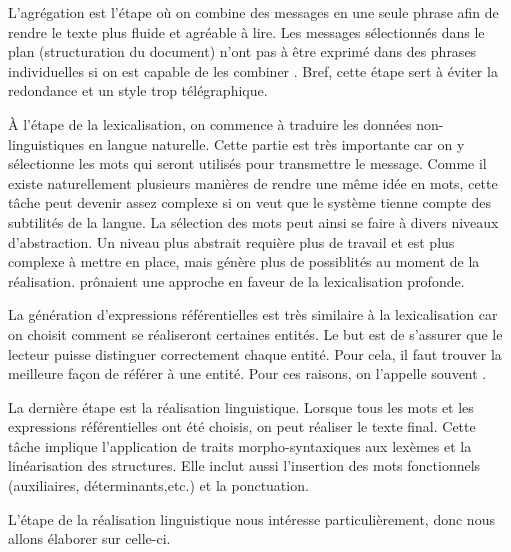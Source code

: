L'agrégation est l'étape où on combine des messages en une seule phrase afin de rendre le texte plus fluide et agréable à lire. Les messages sélectionnés dans le plan (structuration du document) n'ont pas à être exprimé dans des phrases individuelles si on est capable de les combiner \citep{ChengCapturingInteractionAggregation2000}. Bref, cette étape sert à éviter la redondance et un style trop télégraphique.

À l'étape de la lexicalisation, on commence à traduire les données non-linguistiques en langue naturelle. Cette partie est très importante car on y sélectionne les mots qui seront utilisés pour transmettre le message. Comme il existe naturellement plusieurs manières de rendre une même idée en mots, cette tâche peut devenir assez complexe si on veut que le système tienne compte des subtilités de la langue. La sélection des mots peut ainsi se faire à divers niveaux d'abstraction. Un niveau plus abstrait requière plus de travail et est plus complexe à mettre en place, mais génère plus de possiblités au moment de la réalisation. \cite{ElhadadFloatingConstraintsLexical1997} prônaient une approche en faveur de la lexicalisation profonde.

La génération d'expressions référentielles est très similaire à la lexicalisation car on choisit comment se réaliseront certaines entités. Le but est de s'assurer que le lecteur puisse distinguer correctement chaque entité. Pour cela, il faut trouver la meilleure façon de référer à une entité. Pour ces raisons, on l'appelle souvent .

\label{real}
La dernière étape est la réalisation linguistique. Lorsque tous les mots et les expressions référentielles ont été choisis, on peut réaliser le texte final. Cette tâche implique l'application de traits morpho-syntaxiques aux lexèmes et la linéarisation des structures. Elle inclut aussi l'insertion des mots fonctionnels (auxiliaires, déterminants,etc.) et la ponctuation. 

L'étape de la réalisation linguistique nous intéresse particulièrement, donc nous allons élaborer sur celle-ci.

